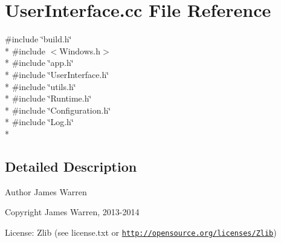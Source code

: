 \section{User\-Interface.\-cc File Reference}
\label{_user_interface_8cc}
{\ttfamily \#include \char`\"{}build.\-h\char`\"{}}\\*
{\ttfamily \#include $<$Windows.\-h$>$}\\*
{\ttfamily \#include \char`\"{}app.\-h\char`\"{}}\\*
{\ttfamily \#include \char`\"{}User\-Interface.\-h\char`\"{}}\\*
{\ttfamily \#include \char`\"{}utils.\-h\char`\"{}}\\*
{\ttfamily \#include \char`\"{}Runtime.\-h\char`\"{}}\\*
{\ttfamily \#include \char`\"{}Configuration.\-h\char`\"{}}\\*
{\ttfamily \#include \char`\"{}Log.\-h\char`\"{}}\\*


\subsection{Detailed Description}
\begin{DoxyAuthor}{Author}
James Warren 
\end{DoxyAuthor}
\begin{DoxyCopyright}{Copyright}
James Warren, 2013-\/2014 
\end{DoxyCopyright}
\begin{DoxyParagraph}{License\-:}
Zlib (see license.\-txt or \href{http://opensource.org/licenses/Zlib}{\tt http\-://opensource.\-org/licenses/\-Zlib}) 
\end{DoxyParagraph}
